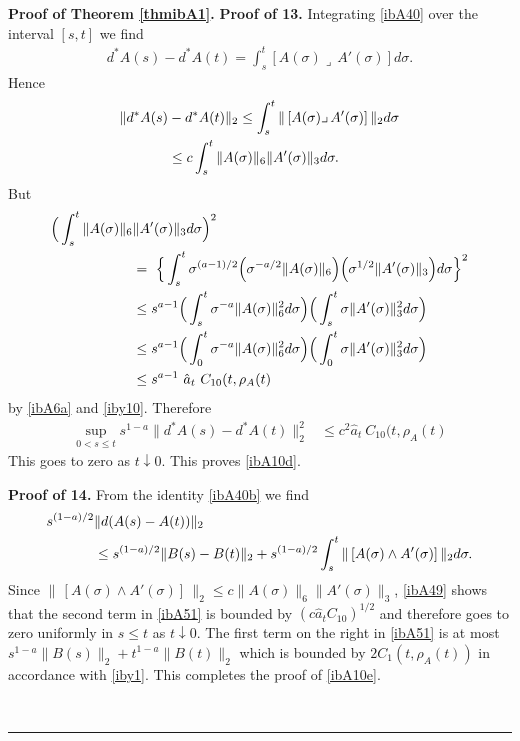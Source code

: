 \documentclass[12pt]{article}
\newenvironment{proof}[1][Proof]{\textbf{#1.} }{\ \rule{0.5em}{0.5em}}
\def \({\Big(}
\def \){\Big)}
\def \eref{\eqref}
\def \s{\sigma}
\def \lrc{\lrcorner\,}
\numberwithin{equation}{section}
\begin{document}
\begin{proof}[Proof of Theorem \ref{thmibA1}]
\bigskip
\noindent
{\bf Proof of 13.}   
Integrating  \eref{ibA40} over the interval $[s,t]$ we find
\begin{align}
d^* A(s) - d^* A(t) = \int_s^t [ A(\s)\lrc A'(\s)] d\s.     \label{ibA40c}
\end{align}
Hence
\begin{align*}
\| d^* A(s) &- d^*A(t)\|_2 \le   \int_s^t \|\,[ A(\s)\lrc A'(\s)]\, \|_2 d\s  \notag\\
&\le c \int_s^t \|A(\s)\|_6 \| A'(\s)\|_3 d\s.                     \notag
\end{align*}
But
\begin{align}
\(\int_s^t \|A(\s)\|_6 &\| A'(\s)\|_3 d\s \)^2 \notag\\
&=\ \Big\{ \int_s^t   \s^{(a-1)/2}  \(\s^{-a/2}  \|A(\s)\|_6\)   \( \s^{1/2} \| A'(\s)\|_3\) d\s\Big\}^2\notag \\
&\le s^{a-1}  \(\int_s^t \s^{-a} \|A(\s)\|_6^2 d\s\) \(\int_s^t \s\|A'(\s)\|_3^2 d\s\)\notag\\
&\le   s^{a-1}  \(\int_0^t \s^{-a} \|A(\s)\|_6^2 d\s\) \(\int_0^t \s\|A'(\s)\|_3^2 d\s\)\notag \\
&\le s^{a-1}\   \hat a_t\     C_{10}(t, \rho_A(t)  \label{ibA49}
\end{align}
by  \eref{ibA6a} and \eref{iby10}.
Therefore
\begin{align}
\sup_{0< s \le t} s^{1-a}\| d^* A(s)- d^*A(t)\|_2^2 
&\le       c^2 \hat a_t\     C_{10}(t, \rho_A(t)        \label{ibA50}       
\end{align}
 This goes to zero as $t\downarrow 0$. This proves  \eref{ibA10d}. 


\bigskip
\noindent
{\bf Proof of 14.} 
 From the identity      \eref{ibA40b}        
 we find 
 \begin{align}
 s^{(1-a)/2} &\|d(A(s) - A(t))\|_2     \notag \\
 &\le s^{(1-a)/2} \|  B(s) - B(t)\|_2  +s^{(1-a)/2} \int_s^t \|\,[A(\s) \wedge A'(\s)]\, \|_2 d\s.  
                      \label{ibA51}
 \end{align}
 Since $ \|\,[A(\s) \wedge A'(\s)]\, \|_2 \le c \|A(\s)\|_6\|A'(\s)\|_3$, \eref{ibA49} shows
 that the second term in \eref{ibA51} is  bounded by $(c  \hat a_t C_{10})^{1/2}$ and therefore goes
 to zero uniformly in $s \le t$ as $t \downarrow 0$. The first term on the right in \eref{ibA51} is at most
 $s^{1-a} \| B(s)\|_2 + t^{1-a} \| B(t)\|_2$ which is bounded by $2 C_1(t, \rho_A(t))$ in
  accordance with   \eref{iby1}. This completes the proof of \eref{ibA10e}.  
  

\end{proof}
\end{document}
